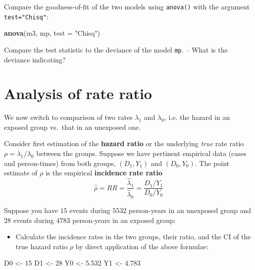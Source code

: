 \documentclass[
]{book}
\newenvironment{Shaded}{\begin{snugshade}}{\end{snugshade}}
\newcommand{\AttributeTok}[1]{\textcolor[rgb]{0.13,0.29,0.53}{#1}}
\newcommand{\DecValTok}[1]{\textcolor[rgb]{0.00,0.00,0.81}{#1}}
\newcommand{\FloatTok}[1]{\textcolor[rgb]{0.00,0.00,0.81}{#1}}
\newcommand{\FunctionTok}[1]{\textcolor[rgb]{0.13,0.29,0.53}{\textbf{#1}}}
\newcommand{\NormalTok}[1]{#1}
\newcommand{\OtherTok}[1]{\textcolor[rgb]{0.56,0.35,0.01}{#1}}
\newcommand{\StringTok}[1]{\textcolor[rgb]{0.31,0.60,0.02}{#1}}
\providecommand{\tightlist}{%
  \setlength{\itemsep}{0pt}\setlength{\parskip}{0pt}}
\begin{document}
Compare the goodness-of-fit of the two models using \texttt{anova()} with the argument
\texttt{test="Chisq"}:

\begin{Shaded}
\begin{Highlighting}[]
\FunctionTok{anova}\NormalTok{(m3, mp, }\AttributeTok{test =} \StringTok{"Chisq"}\NormalTok{)}
\end{Highlighting}
\end{Shaded}

Compare the test statistic to the deviance of the model \texttt{mp}.
-- What is the deviance indicating?

\section{Analysis of rate ratio}\label{analysis-of-rate-ratio}

We now switch to comparison of two rates \(\lambda_1\) and \(\lambda_0\), i.e.
the hazard in an exposed group vs.~that in an unexposed one.

Consider first estimation of the \textbf{hazard ratio} or the underlying \emph{true} rate ratio
\(\rho = \lambda_1/\lambda_0\) between the groups. Suppose we have
pertinent empirical data (cases and person-times) from both groups,
\((D_1,Y_1)\) and \((D_0,Y_0)\). The point estimate of \(\rho\) is the
empirical \textbf{incidence rate ratio}
\[
\widehat{\rho} = RR = \frac{\widehat\lambda_1}{\widehat\lambda_0} = \frac{D_1/Y_1}{D_0/Y_0}
\]

Suppose you have \(15\) events during \(5532\) person-years in an
unexposed group and \(28\) events during \(4783\) person-years in an
exposed group:

\begin{itemize}
\tightlist
\item
  Calculate the incidence rates in the two groups, their ratio, and the CI of the true hazard ratio \(\rho\) by direct application of the above formulae:
\end{itemize}

\begin{Shaded}
\begin{Highlighting}[]
\NormalTok{D0 }\OtherTok{\textless{}{-}} \DecValTok{15}
\NormalTok{D1 }\OtherTok{\textless{}{-}} \DecValTok{28}
\NormalTok{Y0 }\OtherTok{\textless{}{-}} \FloatTok{5.532}
\NormalTok{Y1 }\OtherTok{\textless{}{-}} \FloatTok{4.783}
\end{Highlighting}
\end{Shaded}
\end{document}
